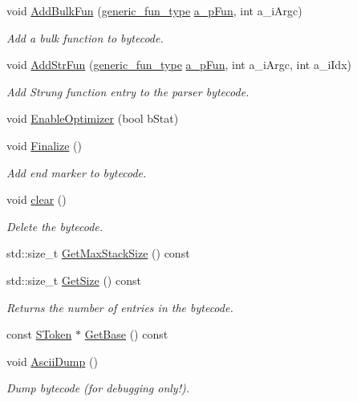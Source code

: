 \begin{DoxyCompactItemize}
void \hyperlink{classmu_1_1_parser_byte_code_a91e2de996576ca0b75cca98e3c383a24}{Add\+Bulk\+Fun} (\hyperlink{namespacemu_ae289766395042975b51dda382cccc907}{generic\+\_\+fun\+\_\+type} \hyperlink{mu_parser_d_l_l_8h_ab3a3ed85edf393f2b8ad69081fe538e8}{a\+\_\+p\+Fun}, int a\+\_\+i\+Argc)
\begin{DoxyCompactList}\small\item\em Add a bulk function to bytecode. \end{DoxyCompactList}\item 
void \hyperlink{classmu_1_1_parser_byte_code_a0118e777231376e8db0af4b001c8830c}{Add\+Str\+Fun} (\hyperlink{namespacemu_ae289766395042975b51dda382cccc907}{generic\+\_\+fun\+\_\+type} \hyperlink{mu_parser_d_l_l_8h_ab3a3ed85edf393f2b8ad69081fe538e8}{a\+\_\+p\+Fun}, int a\+\_\+i\+Argc, int a\+\_\+i\+Idx)
\begin{DoxyCompactList}\small\item\em Add Strung function entry to the parser bytecode. \end{DoxyCompactList}\item 
void \hyperlink{classmu_1_1_parser_byte_code_a1f852b418b0bdd0296bdcf2304d3c795}{Enable\+Optimizer} (bool b\+Stat)
\item 
void \hyperlink{classmu_1_1_parser_byte_code_af68af4cb08ebaf3b12559574319dbb1c}{Finalize} ()
\begin{DoxyCompactList}\small\item\em Add end marker to bytecode. \end{DoxyCompactList}\item 
void \hyperlink{classmu_1_1_parser_byte_code_a9cec7c19c5ebbc1eac31d3b93edae1e4}{clear} ()
\begin{DoxyCompactList}\small\item\em Delete the bytecode. \end{DoxyCompactList}\item 
std\+::size\+\_\+t \hyperlink{classmu_1_1_parser_byte_code_a13d074c938245523f57acf07c94e7774}{Get\+Max\+Stack\+Size} () const 
\item 
std\+::size\+\_\+t \hyperlink{classmu_1_1_parser_byte_code_a7e0a3381b52926cad69793310bd00634}{Get\+Size} () const 
\begin{DoxyCompactList}\small\item\em Returns the number of entries in the bytecode. \end{DoxyCompactList}\item 
const \hyperlink{structmu_1_1_s_token}{S\+Token} $\ast$ \hyperlink{classmu_1_1_parser_byte_code_a22f29a79ec97317c61a3be78420cdb70}{Get\+Base} () const 
\item 
void \hyperlink{classmu_1_1_parser_byte_code_abe87dce6ba88f5ed87cfff70dfd6d035}{Ascii\+Dump} ()
\begin{DoxyCompactList}\small\item\em Dump bytecode (for debugging only!). \end{DoxyCompactList}\end{DoxyCompactItemize}


